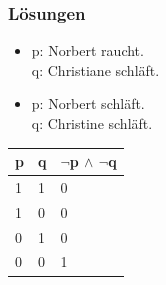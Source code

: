 {\begin{frame}[shrink=20]
\end{frame}

\begin{frame}
\frametitle{Lösungen}

\begin{table}

\begin{minipage}{0.48\textwidth}
\centering
\begin{itemize}
\item[] p: Norbert raucht.\\
q: Christiane schläft.
\end{itemize}
\end{minipage}
%
\begin{minipage}{0.48\textwidth}
\centering
\begin{itemize}
\item[] p: Norbert schläft.\\
q: Christine schläft.
\end{itemize}
\begin{tabular}{l|l|l}
p & q & $ \lnot $p $ \land $ $ \lnot $q\\
\hline
1 & 1 & 0\\
\hline
1 & 0 & 0\\
\hline
0 & 1 & 0\\
\hline
0 & 0 & 1\\
\end{tabular}
\end{minipage}

\end{table}
\end{frame}
}

